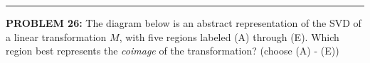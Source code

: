 \documentclass[12pt]{amsart}
\newcommand{\divider}{
  \vspace{-1em} %
  \noindent
  \raisebox{-0.15ex}{\textbullet}%
  \hspace{0.5em}%
  \rule[0.5ex]{0.95\textwidth}{1.0pt}%
  \hspace{0.5em}%
  \raisebox{-0.15ex}{\textbullet}%
  \vspace{0em} %
}
\begin{document}
%
%

\divider

{\bf PROBLEM 26:}
The diagram below is an abstract representation of the SVD of a linear transformation $M$, with five regions labeled (A) through (E). Which region best represents the {\em coimage} of the transformation? (choose (A) - (E))
\end{document}
